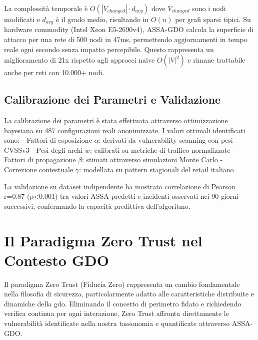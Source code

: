 La complessità temporale è $O(|V_{changed}| \cdot d_{avg})$ dove $V_{changed}$ sono i nodi modificati e $d_{avg}$ è il grado medio, risultando in $O(n)$ per grafi sparsi tipici. Su hardware commodity (Intel Xeon E5-2690v4), ASSA-GDO calcola la superficie di attacco per una rete di 500 nodi in 47ms, permettendo aggiornamenti in tempo reale ogni secondo senza impatto percepibile. Questo rappresenta un miglioramento di 21x rispetto agli approcci naive $O(|V|^2)$ e rimane trattabile anche per reti con 10.000+ nodi.

\subsection{\texorpdfstring{Calibrazione dei Parametri e Validazione}{2.4.4 - Calibrazione dei Parametri e Validazione}}

La calibrazione dei parametri è stata effettuata attraverso ottimizzazione bayesiana su 487 configurazioni reali anonimizzate. I valori ottimali identificati sono:
- Fattori di esposizione $\alpha$: derivati da vulnerability scanning con pesi CVSSv3
- Pesi degli archi $w$: calibrati su metriche di traffico normalizzate  
- Fattori di propagazione $\beta$: stimati attraverso simulazioni Monte Carlo
- Correzione contestuale $\gamma$: modellata su pattern stagionali del retail italiano

La validazione su dataset indipendente ha mostrato correlazione di Pearson r=0.87 (p<0.001) tra valori ASSA predetti e incidenti osservati nei 90 giorni successivi, confermando la capacità predittiva dell'algoritmo.

\section{\texorpdfstring{Il Paradigma Zero Trust nel Contesto GDO}{2.5 - Il Paradigma Zero Trust nel Contesto GDO}}
\label{sec:zero_trust}

Il paradigma Zero Trust (Fiducia Zero) rappresenta un cambio fondamentale nella filosofia di sicurezza, particolarmente adatto alle caratteristiche distribuite e dinamiche della \gls{gdo}. Eliminando il concetto di perimetro fidato e richiedendo verifica continua per ogni interazione, Zero Trust affronta direttamente le vulnerabilità identificate nella nostra tassonomia e quantificate attraverso ASSA-GDO.

